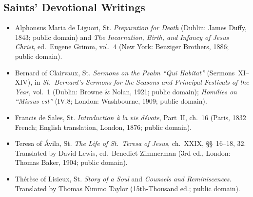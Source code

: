 \subsection{Saints' Devotional Writings}
\begin{itemize}
\item Alphonsus Maria de Liguori, St. \emph{Preparation for Death} (Dublin: James Duffy, 1843; public domain) and \emph{The Incarnation, Birth, and Infancy of Jesus Christ}, ed.\ Eugene Grimm, vol.~4 (New York: Benziger Brothers, 1886; public domain).
\item Bernard of Clairvaux, St. \emph{Sermons on the Psalm ``Qui Habitat''} (Sermons~XI--XIV), in \emph{St.~Bernard's Sermons for the Seasons and Principal Festivals of the Year}, vol.~1 (Dublin: Browne \& Nolan, 1921; public domain); \emph{Homilies on ``Missus est''} (IV.8; London: Washbourne, 1909; public domain).
\item Francis de Sales, St. \emph{Introduction \`a la vie d\'evote}, Part~II, ch.~16 (Paris, 1832 French; English translation, London, 1876; public domain).
\item Teresa of \'Avila, St. \emph{The Life of St.~Teresa of Jesus}, ch.~XXIX, \S\S~16--18, 32. Translated by David Lewis, ed.\ Benedict Zimmerman (3rd ed., London: Thomas Baker, 1904; public domain).
\item Th\'er\`ese of Lisieux, St. \emph{Story of a Soul} and \emph{Counsels and Reminiscences}. Translated by Thomas Nimmo Taylor (15th-Thousand ed.; public domain).
\end{itemize}
